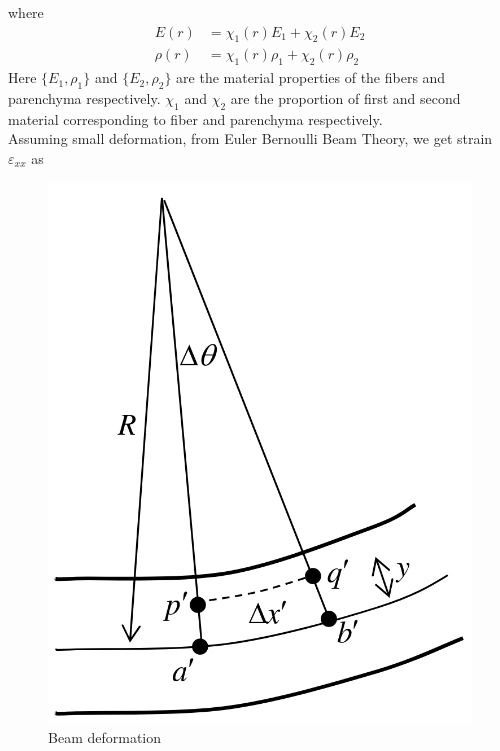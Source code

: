 \documentclass[openright,twoside]{iitkthesis}
\begin{document}
where 
\begin{equation}
\begin{split}
E(r) &= \chi_1(r) E_1 + \chi_2(r) E_2\\
\rho(r) &= \chi_1(r) \rho_1 + \chi_2(r) \rho_2
\end{split}
\end{equation}
Here $\{E_1, \rho_1\}$ and $\{E_2, \rho_2\}$ are the material properties of the fibers and parenchyma respectively. $\chi_1$ and $\chi_2$ are the proportion of first and second material corresponding to fiber and parenchyma respectively.\\
Assuming small deformation, from Euler Bernoulli Beam Theory, we get strain $\varepsilon_{xx}$ as\\
\begin{figure}
\begin{center}
\includegraphics[scale=0.15]{./Plots/normal/eb.png}
\caption{Beam deformation}
\end{center}
\end{figure}
\end{document}
